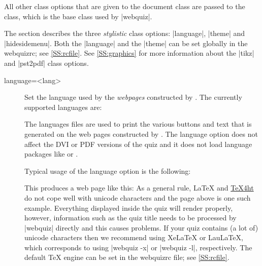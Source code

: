 \documentclass[svgnames]{article}
\newcommand\TeXfht{\href{https://www.ctan.org/tex4ht}{TeX4ht}\xspace}
\newcommand\webquizrc{\index{webquizrc}\textsf{webquizrc}\xspace}
\begin{document}
  All other class options that are given to the \WebQuiz document class
  are passed to the  class, which is the base class
  used by \BashCode|webquiz|.

  The section describes the three \textit{stylistic} class options:
  \LatexCode|language|, \LatexCode|theme| and \LatexCode|hidesidemenu|.
  Both the \LatexCode|language| and the \LatexCode|theme| can be set
  globally in the \webquizrc; see \autoref{SS:rcfile}.  See
  \autoref{SS:graphics} for more information about the
  \LatexCode|tikz| and \LatexCode|pst2pdf| class options.

\begin{description}
  \item[language=<lang>] 
  Set the language used by the \textit{webpages} constructed by \WebQuiz.
  The currently supported languages are:

    \begin{quote}
        
    \end{quote}

    The languages files are used to print the various buttons and text
    that is generated on the web pages constructed by \WebQuiz. The
    \textsf{language} option does not affect the DVI or PDF versions of
    the quiz and it does not load language packages like  or
    .

    Typical usage of the \textsf{language} option is the following:
    
    This produces a web page like this:
    As a general rule, \LaTeX{} and \TeXfht do not cope well with
    unicode characters and the page above is one such example.
    Everything displayed inside the quiz will render properly, however,
    information such as the quiz title needs to be processed by
    \BashCode|webquiz| directly and this causes problems. If your quiz
    contains (a lot of) unicode characters then we recommend using
    Xe\LaTeX{} or Lau\LaTeX, which corresponds to using
    \BashCode|webquiz -x| or \BashCode|webquiz -l|, respectively. The
    default \TeX{} engine can be set in the \webquizrc file; see
    \autoref{SS:rcfile}.


\end{description}
\end{document}
